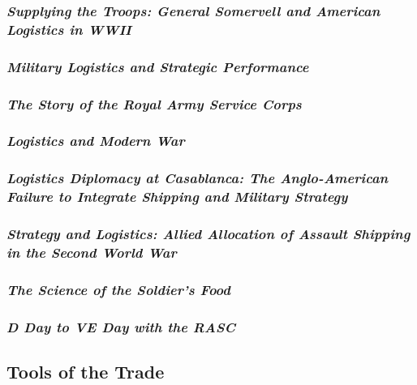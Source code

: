 \documentclass[noraggedright]{turabian-researchpaper}
\begin{document}
		\subsubsection{\textit{Supplying the Troops:  General 
			Somervell and American Logistics in WWII}}
		\subsubsection{\textit{Military Logistics and Strategic 
			Performance}}
		\subsubsection{\textit{The Story of the Royal Army Service
			Corps}}
		\subsubsection{\textit{Logistics and Modern War}}
		\subsubsection{\textit{Logistics Diplomacy at Casablanca: 
			The Anglo-American Failure to Integrate Shipping and
			Military Strategy}}
		\subsubsection{\textit{Strategy and Logistics:  Allied
			Allocation of Assault Shipping in the Second World
			War}}
		\subsubsection{\textit{The Science of the Soldier's Food}}
		\subsubsection{\textit{D Day to VE Day with the RASC}}
	
		

		

	\subsection{Tools of the Trade} %

	
\end{document}
